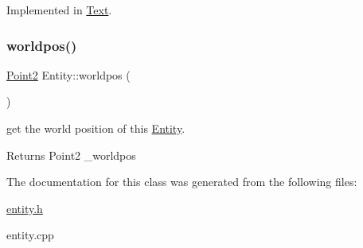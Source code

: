 Implemented in \hyperlink{class_text_a5604f1f74fd487d2972d024575497484}{Text}.

\mbox{\label{class_entity_a85ae0243e89910d56dd7140c8f735f41}} 
\subsubsection{\texorpdfstring{worldpos()}{worldpos()}}
{\footnotesize\ttfamily \hyperlink{pointx_8h_aca903a92c8ced8823fea9fac7e23677a}{Point2} Entity\+::worldpos (\begin{DoxyParamCaption}{ }\end{DoxyParamCaption})\hspace{0.3cm}{\ttfamily [inline]}}



get the world position of this \hyperlink{class_entity}{Entity}. 

\begin{DoxyReturn}{Returns}
Point2 \+\_\+worldpos 
\end{DoxyReturn}


The documentation for this class was generated from the following files\+:\begin{DoxyCompactItemize}
\item 
\hyperlink{entity_8h}{entity.\+h}\item 
entity.\+cpp\end{DoxyCompactItemize}
